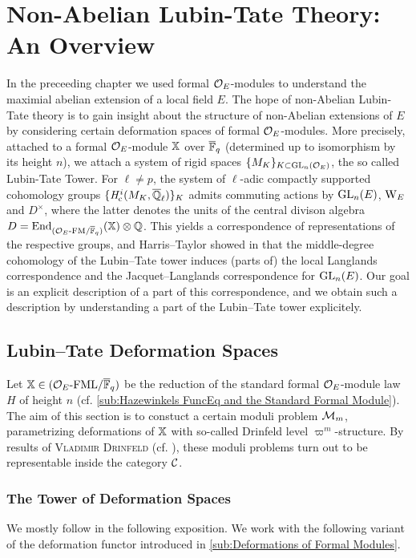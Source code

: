 \documentclass[../main.tex]{subfiles}
\begin{document}
\section{Non-Abelian Lubin-Tate Theory: An Overview} %
\label{sec:Non-Abelian Lubin-Tate Theory: An Overview}
In the preceeding chapter we used formal $\mathcal{O}_E$-modules to understand the 
maximial abelian extension of a local field $E$. The hope of non-Abelian Lubin-Tate
theory is to gain insight about the structure of non-Abelian extensions of $E$
by considering certain deformation spaces of formal $\mathcal{O}_E$-modules.
More precisely, attached to a formal $\mathcal{O}_E$-module $\mathbb{X}$ over ${\overline {\mathbb{F}}_q}$
(determined
up to isomorphism by its height $n$), we attach a system of rigid spaces 
$\{M_K\}_{K \subset \operatorname{GL}_n(\mathcal{O}_E)}$, the so called Lubin-Tate Tower. For $\ell \neq p$, 
the system of $\ell$-adic compactly supported cohomology groups $\{\mathit H_{\mathrm{c}}^{i}(M_K,
\overline {\mathbb{Q}}_\ell)\}_K$ admits commuting actions by $\operatorname{GL}_n(E)$, $\mathrm W_E$ and $D^\times$,
where the latter denotes the units of the central divison algebra $D =
\operatorname{End}_{{({\mathcal{O}_E}\textnormal-\allowbreak\mathrm{FM}/{{\overline {\mathbb{F}}_q}})}}(\mathbb{X}) \otimes \mathbb{Q}$. This yields a correspondence of 
representations of the respective groups, and Harris--Taylor showed in
\cite{HTShimura} that the middle-degree cohomology of the Lubin--Tate tower induces
(parts of) the local Langlands correspondence and the Jacquet--Langlands correspondence
for $\operatorname{GL}_n(E)$. 
Our goal is an explicit description of a part of this correspondence, and we obtain such a
description by understanding a part of the Lubin--Tate tower explicitely.

\subsection{Lubin--Tate Deformation Spaces} %
\label{sub:Lubin-Tate Deformation Spaces}
Let $\mathbb{X} \in {({\mathcal{O}_E}\textnormal-\allowbreak\mathrm{FML}/{{\overline{\mathbb{F}}_q}})}$ be the reduction of the standard formal
$\mathcal{O}_E$-module law $H$ of height $n$ (cf. \cref{sub:Hazewinkels FuncEq and the
Standard Formal Module}).
The aim of this section is to constuct a certain moduli problem $\mathcal{M}_{m}$,
parametrizing deformations of $\mathbb{X}$ with so-called Drinfeld level $\varpi^m$-structure.
By results of \textsc{Vladimir Drinfeld} (cf. \cite{drinfel1974elliptic}),
these moduli problems turn out to be representable inside the category $\mathcal{C}$.

\subsubsection{The Tower of Deformation Spaces} %
\label{ssub:The Tower of Deformation Spaces}
We mostly follow \cite[Chapter 2]{Strauch2008DefSp} in the following
exposition. 
 We work with the following variant of the deformation 
functor introduced in \cref{sub:Deformations of Formal Modules}.
\end{document}
